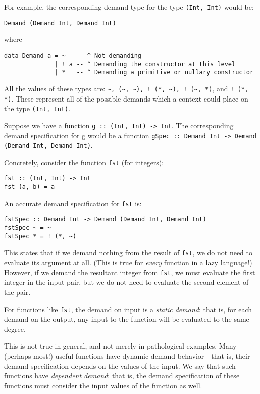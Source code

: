 \documentclass{article}
\begin{document}
For example, the corresponding demand type for the type \verb|(Int, Int)| would be:

\verb|Demand (Demand Int, Demand Int)|

where

\begin{verbatim}
data Demand a = ~   -- ^ Not demanding
              | ! a -- ^ Demanding the constructor at this level
              | *   -- ^ Demanding a primitive or nullary constructor
\end{verbatim}

All the values of these types are:
\verb|~, (~, ~), ! (*, ~), ! (~, *)|, and \verb|! (*, *)|. These
represent all of the possible demands which a context could place on
the type \verb|(Int, Int)|.

Suppose we have a function \verb|g :: (Int, Int) -> Int|. The corresponding
demand specification for g would be a function
\verb|gSpec :: Demand Int -> Demand (Demand Int, Demand Int)|.

Concretely, consider the function \verb|fst| (for integers):

\begin{verbatim}
fst :: (Int, Int) -> Int
fst (a, b) = a
\end{verbatim}

An accurate demand specification for \verb|fst| is:

\begin{verbatim}
fstSpec :: Demand Int -> Demand (Demand Int, Demand Int)
fstSpec ~ = ~
fstSpec * = ! (*, ~)
\end{verbatim}

This states that if we demand nothing from the result of \verb|fst|, we do not
need to evaluate its argument at all. (This is true for \emph{every} function in
a lazy language!) However, if we demand the resultant integer from \verb|fst|,
we must evaluate the first integer in the input pair, but we do not need to
evaluate the second element of the pair.

For functions like \verb|fst|, the demand on input is a \emph{static demand}:
that is, for each demand on the output, any input to the function will be
evaluated to the same degree.

This is not true in general, and not merely in pathological examples. Many
(perhaps most!) useful functions have dynamic demand behavior---that is, their
demand specification depends on the values of the input. We say that such
functions have \emph{dependent demand}: that is, the demand specification of
these functions must consider the input values of the function as well.
\end{document}
